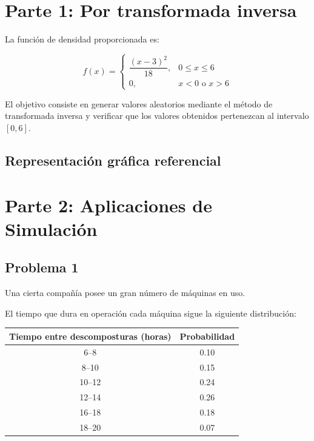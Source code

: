 \documentclass[12pt]{article}
\begin{document}
\section{Parte 1: Por transformada inversa}

La función de densidad proporcionada es:

\[
f(x)=
\begin{cases}
\dfrac{(x-3)^2}{18}{}, & 0 \leq x \leq 6 \\
0, & x < 0 \text{ o } x > 6
\end{cases}
\]

El objetivo consiste en generar valores aleatorios mediante el método de transformada inversa y verificar que los valores obtenidos pertenezcan al intervalo $[0,6]$.

\subsection{Representación gráfica referencial}

\begin{center}
\end{center}

\section{Parte 2: Aplicaciones de Simulación}

\subsection{Problema 1}

Una cierta compañía posee un gran número de máquinas en uso.

El tiempo que dura en operación cada máquina sigue la siguiente distribución:

\begin{center}
\begin{tabular}{cc}
\toprule
Tiempo entre descomposturas (horas) & Probabilidad \\
\midrule
6--8   & 0.10 \\
8--10  & 0.15 \\
10--12 & 0.24 \\
12--14 & 0.26 \\
16--18 & 0.18 \\
18--20 & 0.07 \\
\bottomrule
\end{tabular}
\end{center}
\end{document}
